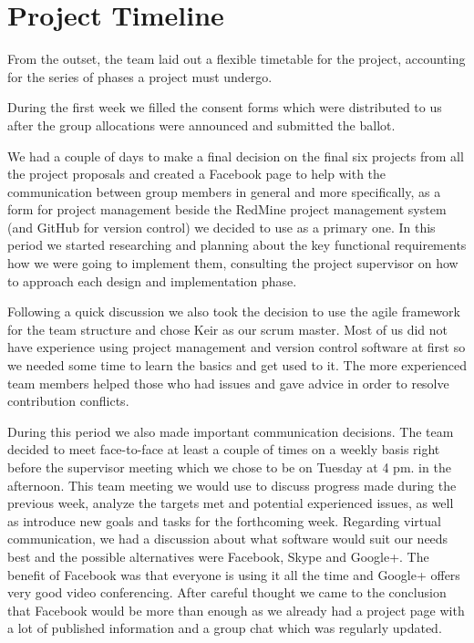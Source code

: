 \documentclass{l3proj}
\begin{document}
\section{Project Timeline}		

From the outset, the team laid out a flexible timetable for the project, accounting for the series of phases a project must undergo.

During the first week we filled the consent forms which were distributed to us after the group allocations were announced and submitted the ballot.

We had a couple of days to make a final decision on the final six projects from all the project proposals and created a Facebook page to help with the communication between group members in general and more specifically, as a form for project management beside the RedMine project management system (and GitHub for version control) we decided to use as a primary one. In this period we started researching and planning about the key functional requirements how we were going to implement them, consulting the project supervisor on how to approach each design and implementation phase.

Following a quick discussion we also took the decision to use the agile framework for the team structure and chose Keir as our scrum master. Most of us did not have experience using project management and version control software at first so we needed some time to learn the basics and get used to it. The more experienced team members helped those who had issues and gave advice in order to resolve contribution conflicts.

During this period we also made important communication decisions. The team decided to meet face-to-face at least a couple of times on a weekly basis right before the supervisor meeting which we chose to be on Tuesday at 4 pm. in the afternoon. This team meeting we would use to discuss progress made during the previous week, analyze the targets met and potential experienced issues, as well as introduce new goals and tasks for the forthcoming week. Regarding virtual communication, we had a discussion about what software would suit our needs best and the possible alternatives were Facebook, Skype and Google+. The benefit of Facebook was that everyone is using it all the time and Google+ offers very good video conferencing. After careful thought we came to the conclusion that Facebook would be more than enough as we already had a project page with a lot of published information and a group chat which was regularly updated.
\end{document}

